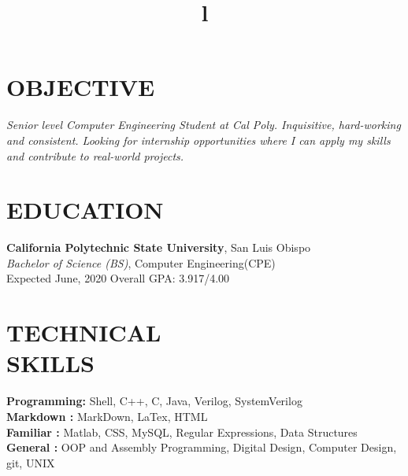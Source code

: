 \documentclass[margin]{res}
\begin{document}
\begin{resume}

\section{OBJECTIVE}
{\sl Senior level Computer Engineering Student at Cal Poly. Inquisitive, hard-working and consistent. Looking for internship opportunities where I can apply my skills and contribute to real-world projects.}

\section{EDUCATION}

\textbf{California Polytechnic State University}, San Luis Obispo\\
{\sl Bachelor of Science (BS)}, Computer Engineering(CPE)\\
Expected June, 2020
\hfill Overall GPA: 3.917/4.00 


\section{TECHNICAL\\SKILLS}

\textbf{Programming:} Shell, C++, C, Java, Verilog, SystemVerilog
\\
\textbf{Markdown :} MarkDown, LaTex, HTML
\\
\textbf{Familiar :} Matlab, CSS, MySQL, Regular Expressions, Data Structures 
\\
\textbf{General :} OOP and Assembly Programming, Digital Design, Computer Design, git, UNIX

\begin{format}
\title{l}\\
\\
\body\\
\end{format}





\end{resume}
\end{document}
